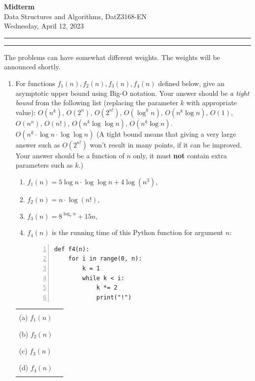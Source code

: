 \documentclass[a4paper,12pt]{article}
\begin{document}
\begin{center}
{\bf\Huge Midterm} \\[5pt]
Data Structures and Algorithms, DatZ3168-EN\\
Wednesday, April 12, 2023\\[5pt]
\end{center}

\hrule
\vspace{2pt}
\hrule
\vspace{12pt}

\noindent
The problems can have somewhat different weights. The weights will be announced shortly.


\begin{enumerate}

\item
For functions $f_1(n), f_2(n), f_3(n), f_4(n)$ defined below, 
give an asymptotic upper bound using Big-O notation.
Your answer should be {\em a tight bound} from the
following list (replacing the parameter $k$ with appropriate value):  
$O(n^k)$, $O(2^n)$, $O(2^{n!})$, $O(\log^k n)$, 
$O(n^k \log n)$, $O(1)$, $O(n^n)$, $O(n!)$, $O(n^k \log \log n)$, $O(n^k \log n)$. 
$O(n^k \cdot \log n \cdot \log \log n)$
(A tight bound means that giving a very large answer such as $O(2^{n!})$ 
won't result in many points, if it can be improved. 
Your answer should be a function of $n$ only, it must {\bf not} contain 
extra   parameters such as $k$.)

\begin{enumerate}
\item $f_1(n) = 5 \log n  \cdot \log \log n + 4 \log(n^3)$,
\item $f_2(n) = n \cdot \log(n!)$,
\item $f_3(n) = 8^{\log_7 n} + 15n$,
\item $f_4(n)$ is the running time of this Python function for argument $n$:
\begin{Verbatim}[frame=single,numbers=left]
def f4(n):
    for i in range(0, n):
        k = 1
        while k < i:
            k *= 2
            print("!")
\end{Verbatim}
\end{enumerate}

\vspace{5ex}

\begin{tabular}{ll}
(a) $f_1(n)$ & \rule{4cm}{0.4pt} \\[5ex]
(b) $f_2(n)$  & \rule{4cm}{0.4pt} \\[5ex]
(c) $f_3(n)$  & \rule{4cm}{0.4pt} \\[5ex]
(d) $f_4(n)$  & \rule{4cm}{0.4pt} \\[5ex]
\end{tabular}





\end{enumerate}
\end{document}
